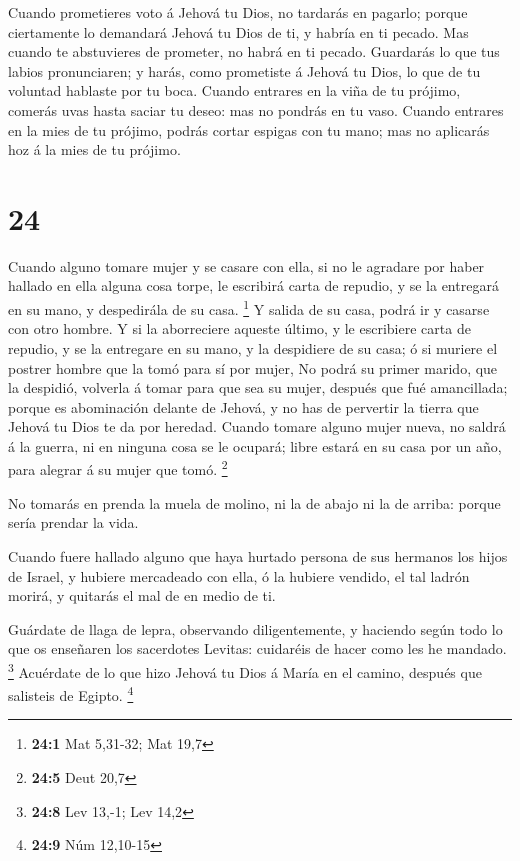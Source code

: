  Cuando prometieres voto á Jehová tu Dios, no tardarás en
pagarlo; porque ciertamente lo demandará Jehová tu Dios de ti, y habría
en ti pecado.  Mas cuando te abstuvieres de prometer, no
habrá en ti pecado.  Guardarás lo que tus labios
pronunciaren; y harás, como prometiste á Jehová tu Dios, lo que de tu
voluntad hablaste por tu boca.  Cuando entrares en la viña
de tu prójimo, comerás uvas hasta saciar tu deseo: mas no pondrás en tu
vaso.  Cuando entrares en la mies de tu prójimo, podrás
cortar espigas con tu mano; mas no aplicarás hoz á la mies de tu
prójimo.

\hypertarget{section-23}{%
\section{24}\label{section-23}}

 Cuando alguno tomare mujer y se casare con ella, si no le
agradare por haber hallado en ella alguna cosa torpe, le escribirá carta
de repudio, y se la entregará en su mano, y despedirála de su casa.
\footnote{\textbf{24:1} Mat 5,31-32; Mat 19,7}  Y salida de
su casa, podrá ir y casarse con otro hombre.  Y si la
aborreciere aqueste último, y le escribiere carta de repudio, y se la
entregare en su mano, y la despidiere de su casa; ó si muriere el
postrer hombre que la tomó para sí por mujer,  No podrá su
primer marido, que la despidió, volverla á tomar para que sea su mujer,
después que fué amancillada; porque es abominación delante de Jehová, y
no has de pervertir la tierra que Jehová tu Dios te da por heredad.
 Cuando tomare alguno mujer nueva, no saldrá á la guerra, ni
en ninguna cosa se le ocupará; libre estará en su casa por un año, para
alegrar á su mujer que tomó. \footnote{\textbf{24:5} Deut 20,7}

 No tomarás en prenda la muela de molino, ni la de abajo ni
la de arriba: porque sería prendar la vida.

 Cuando fuere hallado alguno que haya hurtado persona de sus
hermanos los hijos de Israel, y hubiere mercadeado con ella, ó la
hubiere vendido, el tal ladrón morirá, y quitarás el mal de en medio de
ti.

 Guárdate de llaga de lepra, observando diligentemente, y
haciendo según todo lo que os enseñaren los sacerdotes Levitas:
cuidaréis de hacer como les he mandado. \footnote{\textbf{24:8} Lev
  13,-1; Lev 14,2}  Acuérdate de lo que hizo Jehová tu Dios
á María en el camino, después que salisteis de Egipto. \footnote{\textbf{24:9}
  Núm 12,10-15}

